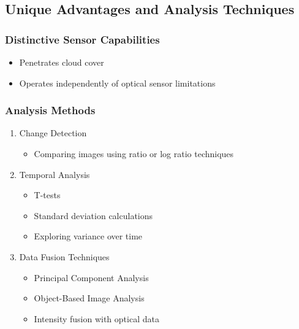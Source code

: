 \documentclass[
  letterpaper,
]{scrbook}
\providecommand{\tightlist}{%
  \setlength{\itemsep}{0pt}\setlength{\parskip}{0pt}}\usepackage{longtable,booktabs,array}
\begin{document}
\subsection{Unique Advantages and Analysis
Techniques}\label{unique-advantages-and-analysis-techniques}

\subsubsection{Distinctive Sensor
Capabilities}\label{distinctive-sensor-capabilities}

\begin{itemize}
\tightlist
\item
  Penetrates cloud cover
\item
  Operates independently of optical sensor limitations
\end{itemize}

\subsubsection{Analysis Methods}\label{analysis-methods}

\begin{enumerate}
\def\labelenumi{\arabic{enumi}.}
\item
  Change Detection

  \begin{itemize}
  \tightlist
  \item
    Comparing images using ratio or log ratio techniques
  \end{itemize}
\item
  Temporal Analysis

  \begin{itemize}
  \item
    T-tests
  \item
    Standard deviation calculations
  \item
    Exploring variance over time
  \end{itemize}
\item
  Data Fusion Techniques

  \begin{itemize}
  \item
    Principal Component Analysis
  \item
    Object-Based Image Analysis
  \item
    Intensity fusion with optical data
  \end{itemize}
\end{enumerate}
\end{document}
